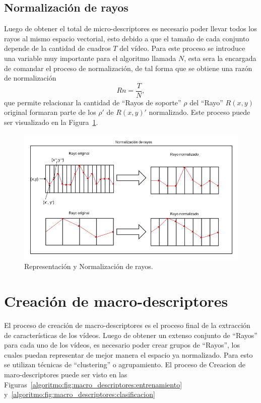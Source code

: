 	\subsection{Normalización de rayos}
	\label{algoritmo:normalizacion}
	Luego de obtener el total de micro-descriptores es necesario poder llevar todos los rayos al mismo espacio vectorial, esto debido a que el tamaño de cada conjunto depende de la cantidad de cuadros $T$ del vídeo. Para este proceso se introduce una variable muy importante para el algoritmo llamada $N$, esta sera la encargada de comandar el proceso de normalización, de tal forma que se obtiene una razón de normalización
	\begin{equation}
		Rn = \frac{T}{N},
	\end{equation}
	que permite relacionar la cantidad de ``Rayos de soporte'' $\rho$ del ``Rayo'' $R(x,y)$ original formaran parte de los $\rho'$ de $R(x,y)'$ normalizado. Este proceso puede ser visualizado en la Figura~\ref{algoritmo:fig:normalizacion}.
	
	\begin{figure}[bt]
		\centering
    		\includegraphics[width=1\textwidth]{Figuras/Diagramas/normalizacion_de_rayos.png}
  		\caption{Representación y Normalización de rayos.}
  		\label{algoritmo:fig:normalizacion}
	\end{figure}	

	
\newpage	
\section{Creación de macro-descriptores}
\label{sec:macro-descriptores}
El proceso de creación de macro-descriptores es el proceso final de la extracción de características de los vídeos. Luego de obtener un extenso conjunto de ``Rayos'' para cada uno de los vídeos, es necesario poder crear grupos de ``Rayos'', los cuales puedan representar de mejor manera el espacio ya normalizado. Para esto se utilizan técnicas de ``clustering'' o agrupamiento. El proceso de Creacion de maro-descriptores puede ser visto en las Figuras~\ref{algoritmo:fig:macro_descriptores:entrenamiento} y~\ref{algoritmo:fig:macro_descriptores:clasificacion}

